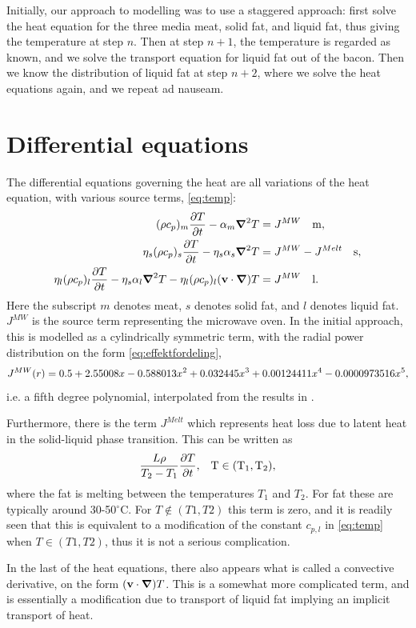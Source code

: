 Initially, our approach to modelling was to use a staggered approach: first solve the
heat equation for the three media meat, solid fat, and liquid fat, thus giving
the temperature at step $n$. Then at step $n+1$, the temperature is regarded as
known, and we solve the transport equation for liquid fat out of the bacon. Then
we know the distribution of liquid fat at step $n+2$, where we solve the heat
equations again, and we repeat ad nauseam.

\section{Differential equations}
The differential equations governing the heat are all variations of the heat
equation, with various source terms, \cref{eq:temp}:
\begin{align}
  \label{eq:temp}
  (\rho c_p)_m \frac{\partial T}{\partial t} - \alpha_m \mbox{\boldmath$ \nabla $} ^2 T &= J^{MW} \quad \rm{m,} \\
  \eta_s (\rho c_p)_s \frac{\partial T}{\partial t} - \eta_s\alpha_s \mbox{\boldmath$ \nabla $} ^2 T &= J^{MW} - J^{Melt}  \quad \rm{s,} \\
  \eta_l (\rho c_p)_l \frac{\partial T}{\partial t} - \eta_s\alpha_l \mbox{\boldmath$ \nabla $} ^2 T - \eta_l(\rho c_p)_l(\mathbf{v}\cdot
  \mbox{\boldmath$ \nabla $})T &= J^{MW}  \quad \rm{l.}
\end{align}
Here the subscript $m$ denotes meat, $s$ denotes solid fat, and $l$ denotes
liquid fat. $J^{MW}$ is the source term representing the microwave oven.
In the initial approach, this is modelled as a cylindrically symmetric term,
with the radial power distribution on the form \cref{eq:effektfordeling},
\begin{equation}
  J^{MW}(r) = 0.5 + 2.55008x - 0.588013x^2 + 0.032445x^3 + 0.00124411x^4 - 0.0000973516x^5 \rm{,}
  \label{eq:effektfordeling}
\end{equation}
i.e. a fifth degree polynomial, interpolated from the results in \cite{huang+zhu}.

Furthermore, there is the term $J^{Melt}$ which represents heat loss due to
latent heat in the solid-liquid phase transition. This can be written as 
\[ \frac{L \rho}{T_2-T_1} \frac{\partial T}{\partial t} \rm{,} \quad T \in (T_1,T_2) \rm{,}\]
where the fat is melting between the temperatures $T_1$ and $T_2$. For fat these
are typically around 30-50$^\circ$C. For $T \notin (T1,T2)$ this term is zero,
and it is readily seen that this is equivalent to a modification of the constant
$c_{p,l}$ in \cref{eq:temp} when $T \in (T1,T2)$, thus it is not a serious
complication.

In the last of the heat equations, there also appears what is called a
convective derivative, on the form $(\mathbf{v}\cdot \mbox{\boldmath$ \nabla $})T$. This is a somewhat
more complicated term, and is essentially a modification due to transport of
liquid fat implying an implicit transport of heat.


